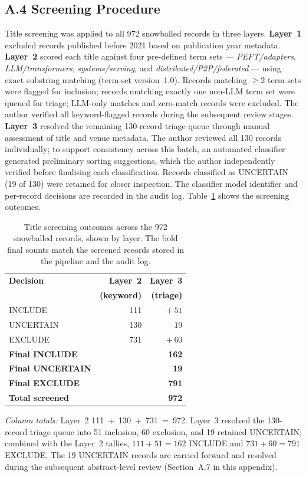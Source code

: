 \subsection*{A.4 Screening Procedure}

Title screening was applied to all 972 snowballed records in three layers.
\textbf{Layer~1} excluded records published before 2021 based on publication
year metadata. \textbf{Layer~2} scored each title against four pre-defined
term sets --- \textit{PEFT/adapters}, \textit{LLM/transformers},
\textit{systems/serving}, and \textit{distributed/P2P/federated} --- using
exact substring matching (term-set version~1.0). Records matching $\geq$2
term sets were flagged for inclusion; records matching exactly one non-LLM
term set were queued for triage; LLM-only matches and zero-match records were
excluded. The author verified all keyword-flagged records during the
subsequent review stages. \textbf{Layer~3} resolved the remaining 130-record
triage queue through manual assessment of title and venue metadata. The author
reviewed all 130 records individually; to support consistency across this
batch, an automated classifier generated preliminary sorting suggestions,
which the author independently verified before finalising each
classification. Records classified as UNCERTAIN (19 of 130) were retained for
closer inspection. The classifier model identifier and per-record decisions
are recorded in the audit log. Table~\ref{tab:screening} shows the screening
outcomes.

\begin{table}[H]
\centering
\caption{Title screening outcomes across the 972 snowballed records, shown by
layer. The bold final counts match the screened records stored in the pipeline
and the audit log.}
\label{tab:screening}
\begin{tabular}{lrr}
\toprule
\textbf{Decision} & \textbf{Layer~2} & \textbf{Layer~3} \\
 & \textbf{(keyword)} & \textbf{(triage)} \\
\midrule
INCLUDE           & 111 & ${+}\,51$ \\
UNCERTAIN         & 130 & $\phantom{+}19$ \\
EXCLUDE           & 731 & ${+}\,60$ \\
\midrule
\textbf{Final INCLUDE}   & \multicolumn{2}{r}{\textbf{162}} \\
\textbf{Final UNCERTAIN} & \multicolumn{2}{r}{\textbf{19}} \\
\textbf{Final EXCLUDE}   & \multicolumn{2}{r}{\textbf{791}} \\
\midrule
\textbf{Total screened}  & \multicolumn{2}{r}{\textbf{972}} \\
\bottomrule
\end{tabular}
\end{table}
\vspace*{-2pt}
\emph{Column totals:} Layer~2 \mbox{111 + 130 + 731 = 972}. Layer~3 resolved
the 130-record triage queue into 51 inclusion, 60 exclusion, and 19 retained
UNCERTAIN; combined with the Layer~2 tallies, $111{+}51{=}162$ INCLUDE and
$731{+}60{=}791$ EXCLUDE. The 19 UNCERTAIN records are carried forward and resolved during the
subsequent abstract-level review (Section~A.7 in this appendix).

